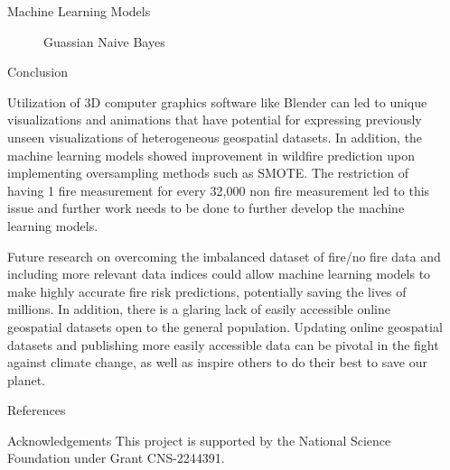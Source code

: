 \documentclass[final]{beamer}
\newlength{\sepwidth}
\newlength{\colwidth}
\newcommand{\separatorcolumn}{\begin{column}{\sepwidth}\end{column}}
\begin{document}
\begin{frame}[t]
\begin{columns}[t]
\begin{column}{\colwidth}
\begin{exampleblock}{Machine Learning Models}
\begin{figure}
\begin{minipage}{0.5\textwidth}
            \caption{Guassian Naive Bayes}
            \label{fig:wind.png}
        \end{minipage}
    \end{figure}
    
  \end{exampleblock}

  \begin{block}{Conclusion}

    Utilization of 3D computer graphics software like Blender can led to unique visualizations and animations that have potential for expressing previously unseen visualizations of heterogeneous geospatial datasets. In addition, the machine learning models showed improvement in wildfire prediction upon implementing oversampling methods such as SMOTE. The restriction of having 1 fire measurement for every 32,000 non fire measurement led to this issue and further work needs to be done to further develop the machine learning models.

    Future research on overcoming the imbalanced dataset of fire/no fire data and including more relevant data indices could allow machine learning models to make highly accurate fire risk predictions, potentially saving the lives of millions. In addition, there is a glaring lack of easily accessible online geospatial datasets open to the general population. Updating online geospatial datasets and publishing more easily accessible data can be pivotal in the fight against climate change, as well as inspire others to do their best to save our planet. 

  \end{block}

  \begin{block}{References}
    \vspace{-0.2cm}
    \nocite{*}
    \footnotesize{}



  \end{block}
  \begin{block}{Acknowledgements}
    This project is supported by the National Science Foundation under Grant CNS-2244391.
  \end{block}
\end{column}

\separatorcolumn
\end{columns}

\end{frame}
\end{document}
